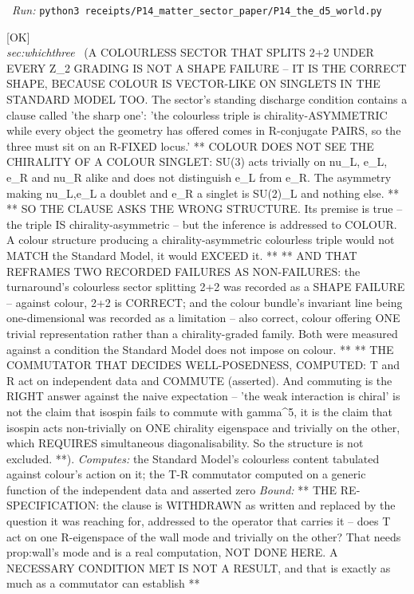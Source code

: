 \begin{description}
\ \emph{Run:} \texttt{python3 receipts/P14\_matter\_sector\_paper/P14\_the\_d5\_world.py}
\item[\rcptlabel{P14_colour_is_vector_like_on_singlets}{P14R37}\textbf{P14R37}\quad\texttt{P14\_colour\_is\_vector\_like\_on\_singlets}]\hfill\textsf{[OK]}\\
\textit{sec:whichthree} \ (A COLOURLESS SECTOR THAT SPLITS 2+2 UNDER EVERY Z\_2 GRADING IS NOT A SHAPE FAILURE -- IT IS THE CORRECT SHAPE, BECAUSE COLOUR IS VECTOR-LIKE ON SINGLETS IN THE STANDARD MODEL TOO. The sector's standing discharge condition contains a clause called 'the sharp one': 'the colourless triple is chirality-ASYMMETRIC while every object the geometry has offered comes in R-conjugate PAIRS, so the three must sit on an R-FIXED locus.' ** COLOUR DOES NOT SEE THE CHIRALITY OF A COLOUR SINGLET: SU(3) acts trivially on nu\_L, e\_L, e\_R and nu\_R alike and does not distinguish e\_L from e\_R. The asymmetry making nu\_L,e\_L a doublet and e\_R a singlet is SU(2)\_L and nothing else. ** ** SO THE CLAUSE ASKS THE WRONG STRUCTURE. Its premise is true -- the triple IS chirality-asymmetric -- but the inference is addressed to COLOUR. A colour structure producing a chirality-asymmetric colourless triple would not MATCH the Standard Model, it would EXCEED it. ** ** AND THAT REFRAMES TWO RECORDED FAILURES AS NON-FAILURES: the turnaround's colourless sector splitting 2+2 was recorded as a SHAPE FAILURE -- against colour, 2+2 is CORRECT; and the colour bundle's invariant line being one-dimensional was recorded as a limitation -- also correct, colour offering ONE trivial representation rather than a chirality-graded family. Both were measured against a condition the Standard Model does not impose on colour. ** ** THE COMMUTATOR THAT DECIDES WELL-POSEDNESS, COMPUTED: T and R act on independent data and COMMUTE (asserted). And commuting is the RIGHT answer against the naive expectation -- 'the weak interaction is chiral' is not the claim that isospin fails to commute with gamma\textasciicircum{}5, it is the claim that isospin acts non-trivially on ONE chirality eigenspace and trivially on the other, which REQUIRES simultaneous diagonalisability. So the structure is not excluded. **). 
\emph{Computes:} the Standard Model's colourless content tabulated against colour's action on it; the T-R commutator computed on a generic function of the independent data and asserted zero
 \emph{Bound:} ** THE RE-SPECIFICATION: the clause is WITHDRAWN as written and replaced by the question it was reaching for, addressed to the operator that carries it -- does T act on one R-eigenspace of the wall mode and trivially on the other? That needs prop:wall's mode and is a real computation, NOT DONE HERE. A NECESSARY CONDITION MET IS NOT A RESULT, and that is exactly as much as a commutator can establish **

\end{description}
